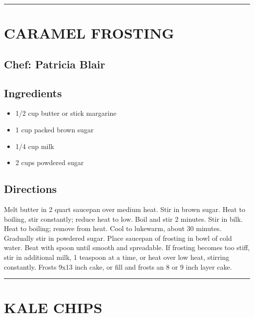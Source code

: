 \documentclass[
]{book}
\providecommand{\tightlist}{%
  \setlength{\itemsep}{0pt}\setlength{\parskip}{0pt}}
\begin{document}
\begin{center}\rule{0.5\linewidth}{0.5pt}\end{center}

\hypertarget{caramel-frosting}{%
\section*{CARAMEL FROSTING}\label{caramel-frosting}}


\hypertarget{chef-patricia-blair-20}{%
\subsection*{Chef: Patricia Blair}\label{chef-patricia-blair-20}}


\hypertarget{ingredients-116}{%
\subsection*{Ingredients}\label{ingredients-116}}


\begin{itemize}
\tightlist
\item
  1/2 cup butter or stick margarine
\item
  1 cup packed brown sugar
\item
  1/4 cup milk
\item
  2 cups powdered sugar
\end{itemize}

\hypertarget{directions-116}{%
\subsection*{Directions}\label{directions-116}}


Melt butter in 2 quart saucepan over medium heat. Stir in brown sugar. Heat to boiling, stir constantly; reduce heat to low. Boil and stir 2 minutes. Stir in bilk. Heat to boiling; remove from heat. Cool to lukewarm, about 30 minutes. Gradually stir in powdered sugar. Place saucepan of frosting in bowl of cold water. Beat with spoon until smooth and spreadable. If frosting becomes too stiff, stir in additional milk, 1 teaspoon at a time, or heat over low heat, stirring constantly. Frosts 9x13 inch cake, or fill and frosts an 8 or 9 inch layer cake.

\begin{center}\rule{0.5\linewidth}{0.5pt}\end{center}

\hypertarget{kale-chips}{%
\section*{KALE CHIPS}\label{kale-chips}}
\end{document}

